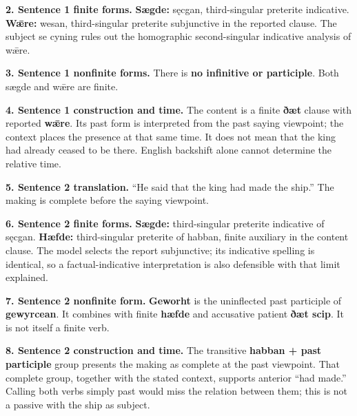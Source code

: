 \textbf{2. Sentence 1 finite forms.} \textbf{Sægde:} sęcgan, third-singular preterite indicative. \textbf{Wǣre:} wesan, third-singular preterite subjunctive in the reported clause. The subject se cyning rules out the homographic second-singular indicative analysis of wǣre.

\textbf{3. Sentence 1 nonfinite forms.} There is \textbf{no infinitive or participle}. Both sægde and wǣre are finite.

\textbf{4. Sentence 1 construction and time.} The content is a finite \textbf{ðæt} clause with reported \textbf{wǣre}. Its past form is interpreted from the past saying viewpoint; the context places the presence at that same time. It does not mean that the king had already ceased to be there. English backshift alone cannot determine the relative time.

\textbf{5. Sentence 2 translation.} “He said that the king had made the ship.” The making is complete before the saying viewpoint.

\textbf{6. Sentence 2 finite forms.} \textbf{Sægde:} third-singular preterite indicative of sęcgan. \textbf{Hæfde:} third-singular preterite of habban, finite auxiliary in the content clause. The model selects the report subjunctive; its indicative spelling is identical, so a factual-indicative interpretation is also defensible with that limit explained.

\textbf{7. Sentence 2 nonfinite form.} \textbf{Geworht} is the uninflected past participle of \textbf{gewyrcean}. It combines with finite \textbf{hæfde} and accusative patient \textbf{ðæt scip}. It is not itself a finite verb.

\textbf{8. Sentence 2 construction and time.} The transitive \textbf{habban + past participle} group presents the making as complete at the past viewpoint. That complete group, together with the stated context, supports anterior “had made.” Calling both verbs simply past would miss the relation between them; this is not a passive with the ship as subject.

